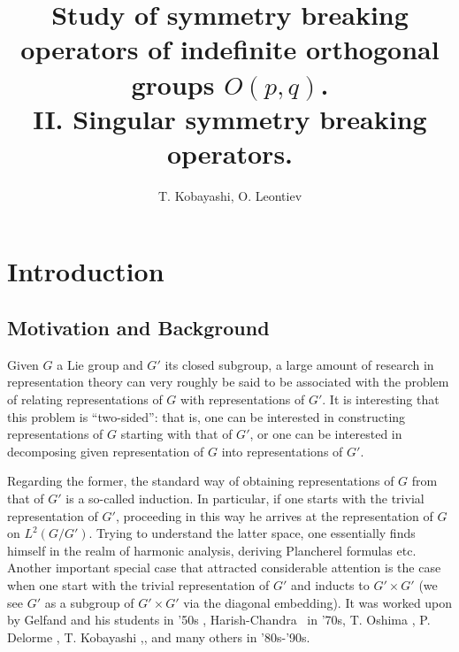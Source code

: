 \documentclass{article}
\numberwithin{definition}{section}
\numberwithin{lemma}{section}
\numberwithin{proposition}{section}
{\theorembodyfont{\rmfamily}\newtheorem{remark}{Remark}
\numberwithin{remark}{section}
}
\begin{document}
\title{Study of symmetry breaking operators of indefinite orthogonal groups $O( p, q)$.\\ 
II. Singular symmetry breaking operators.}
\author{T. Kobayashi, O. Leontiev}
\maketitle

{\tableofcontents}

\setcounter{section}{10}
\section{Introduction}

\subsection{Motivation and Background}

Given $G$ a Lie group and $G'$ its closed subgroup, a large amount of research
in representation theory can very roughly be said to be associated with the
problem of relating representations of $G$ with representations of $G'$. It is
interesting that this problem is ``two-sided'': that is, one can be interested
in constructing representations of $G$ starting with that of $G'$, or one can
be interested in decomposing given representation of $G$ into representations
of $G'$.

Regarding the former, the standard way of obtaining representations of $G$
from that of $G'$ is a so-called induction. In particular, if one starts with
the trivial representation of $G'$, proceeding in this way he arrives at the
representation of $G$ on $L^2 ( G / G')$. Trying to understand the latter
space, one essentially finds himself in the realm of harmonic analysis,
deriving Plancherel formulas etc. Another important special case that
attracted considerable attention is the case when one start with the trivial
representation of $G'$ and inducts to $G' \times G'$ (we see $G'$ as a
subgroup of $G' \times G'$ via the diagonal embedding). It was worked upon by
Gelfand and his students {\cite{gelfand1966generalized}} in '50s ,
Harish-Chandra {\cite{harishchandra1978harmonic}} \ in '70s, T. Oshima
{\cite{oshima1984description}}, P. Delorme {\cite{delorme1998plancherel}}, T.
Kobayashi
{\cite{kobayashi1994discrete1}},{\cite{kobayashi1998discrete2}},{\cite{kobayashi1998discrete3}}
and many others in '80s-'90s.
\end{document}
